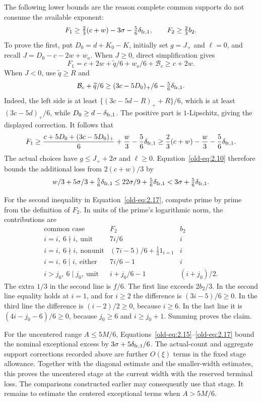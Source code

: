\documentclass[12pt]{article}
\begin{document}
The following lower bounds are the reason complete common supports
do not consume the available exponent:
\begin{equation}
 F_1\ge\tfrac23(c+w)-3\sigma-\tfrac56\delta_{{\rm fr},1},\qquad
 F_2\ge\tfrac23b_2.
 \label{old-eq:2.17}
\end{equation}
To prove the first, put \(D_0=d+K_0-K\), initially set
\(g=J_+\) and \(\ell=0\), and recall
\(J=D_0-c-2w+w_o\).  When \(J\ge0\), direct simplification
gives
\[
 F_1=c+2w+\widetilde q/6+w_o/6+\mathcal B_c
       \ge c+2w.
\]
When \(J<0\), use \(\widetilde q\ge R\) and
\[
 \mathcal B_c+\widetilde q/6
 \ge (3c-5D_0)_+/6-\tfrac56\delta_{{\rm fr},1}.
\]
Indeed, the left side is at least
\(\{(3c-5d-R)_++R\}/6\), which is at least
\((3c-5d)_+/6\), while
\(D_0\ge d-\delta_{{\rm fr},1}\).  The positive part is
\(1\)-Lipschitz, giving the displayed correction.
It follows that
\[
 F_1\ge
 \frac{c+5D_0+(3c-5D_0)_+}{6}+\frac w3
       -\frac56\delta_{{\rm fr},1}
 \ge\frac23(c+w)-\frac w3-\frac56\delta_{{\rm fr},1}.
\]
The actual choices have \(g\le J_++2\sigma\) and
\(\ell\ge0\).  Equation~\eqref{old-eq:2.10} therefore bounds
the additional loss from \(2(c+w)/3\) by
\[
 w/3+5\sigma/3+\tfrac56\delta_{{\rm fr},1}
 \le22\sigma/9+\tfrac56\delta_{{\rm fr},1}
 <3\sigma+\tfrac56\delta_{{\rm fr},1}.
\]

For the second inequality in Equation~\eqref{old-eq:2.17}, compute
prime by prime from the definition of \(F_2\).  In units of the
prime's logarithmic norm, the contributions are
\[
 \begin{array}{c|c|c}
 \text{common case}&F_2&b_2\\ \hline
 i=i,\ 6\nmid i,\ \text{unit}&7i/6&i\\
 i=i,\ 6\nmid i,\ \text{nonunit}
       &(7i-5)/6+\tfrac13 1_{i=1}&i\\
 i=i,\ 6\mid i,\ \text{either}&7i/6-1&i\\
 i>j_0,\ 6\mid j_0,\ \text{unit}
       &i+j_0/6-1&(i+j_0)/2 .
 \end{array}
\]
The extra \(1/3\) in the second line is \(f/6\).  The first
line exceeds \(2b_2/3\).  In the second line equality holds at
\(i=1\), and for \(i\ge2\) the difference is
\((3i-5)/6\ge0\).  In the third line the difference is
\((i-2)/2\ge0\), because \(i\ge6\).  In the last line it is
\((4i-j_0-6)/6\ge0\), because \(j_0\ge6\) and
\(i\ge j_0+1\).  Summing proves the claim.

For the uncentered range \(A\le5M/6\),
Equations~\eqref{old-eq:2.15}--\eqref{old-eq:2.17}
bound the nominal exceptional excess by
\(3\sigma+5\delta_{{\rm fr},1}/6\).  The actual-count and aggregate
support corrections recorded above are further \(O(\xi)\) terms
in the fixed stage allowance.  Together with the
diagonal estimate and the smaller-width estimates, this proves the
uncentered stage at the current width with the reserved terminal
loss.  The comparisons constructed earlier may consequently use
that stage.  It remains to estimate the centered exceptional terms
when \(A>5M/6\).
\end{document}

